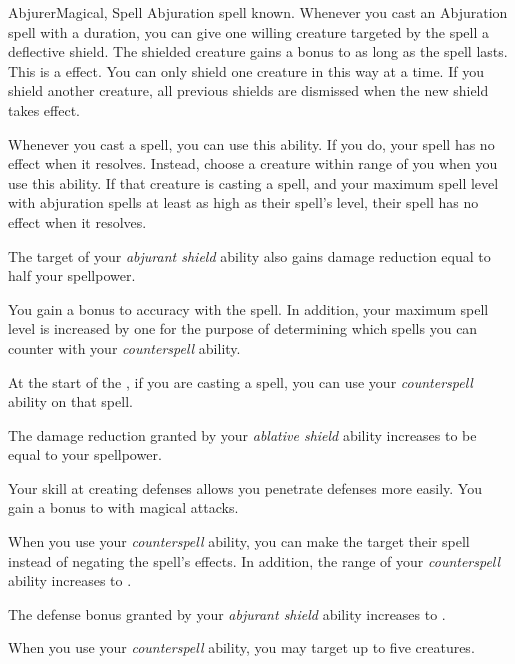     \begin{feat}{Abjurer}{Magical, Spell}
        \featpre Abjuration spell known.
        \featben
         Whenever you cast an Abjuration spell with a duration, you can give one willing creature targeted by the spell a deflective shield.
        The shielded creature gains a  bonus to  as long as the spell lasts.
        This is a   effect.
        You can only shield one creature in this way at a time.
        If you shield another creature, all previous shields are dismissed when the new shield takes effect.

         Whenever you cast a spell, you can use this ability.
        If you do, your spell has no effect when it resolves.
        Instead, choose a creature within \rngmed range of you when you use this ability.
        If that creature is casting a spell, and your maximum spell level with abjuration spells at least as high as their spell's level, their spell has no effect when it resolves.

         The target of your \textit{abjurant shield} ability also gains damage reduction equal to half your spellpower.

         You gain a  bonus to accuracy with the  spell.
        In addition, your maximum spell level is increased by one for the purpose of determining which spells you can counter with your \textit{counterspell} ability.

         At the start of the , if you are casting a spell, you can use your \textit{counterspell} ability on that spell.

         The damage reduction granted by your \textit{ablative shield} ability increases to be equal to your spellpower.

         Your skill at creating defenses allows you penetrate defenses more easily.
        You gain a  bonus to  with magical attacks.

         When you use your \textit{counterspell} ability, you can make the target  their spell instead of negating the spell's effects.
        In addition, the range of your \textit{counterspell} ability increases to \rnglong.

         The defense bonus granted by your \textit{abjurant shield} ability increases to .

         When you use your \textit{counterspell} ability, you may target up to five creatures.
    \end{feat}


